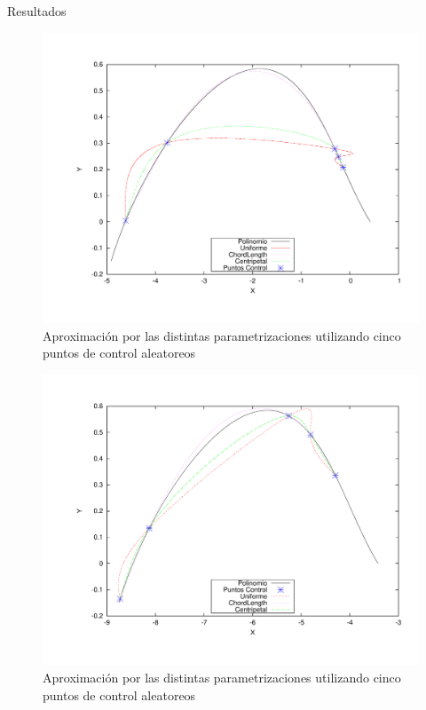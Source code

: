 \begin{section}{Resultados}
	\begin{figure}[H]
	  \centering
		\includegraphics[width=14cm]{graficos/5p_r.pdf}
	  \caption{Aproximación por las distintas parametrizaciones utilizando cinco puntos de control aleatoreos}
	  \label{fig:5p_r}
	\end{figure}
	
	\VSP
	
	
	\begin{figure}[H]
	  \centering
		\includegraphics[width=14cm]{graficos/5p.pdf}
	  \caption{Aproximación por las distintas parametrizaciones utilizando cinco puntos de control aleatoreos}
	  \label{fig:5p}
	\end{figure}
	

\end{section}
